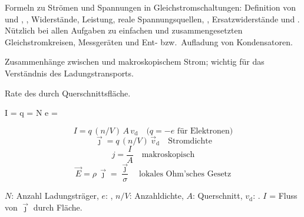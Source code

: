 

\begin{runintext}
Formeln zu Strömen und Spannungen in Gleichstromschaltungen: Definition von  und , , Widerstände, Leistung, reale Spannungsquellen, , Ersatzwiderstände und . Nützlich bei allen Aufgaben zu einfachen und zusammengesetzten Gleichstromkreisen, Messgeräten und Ent- bzw.\ Aufladung von Kondensatoren.
\end{runintext}

\begin{runintext}
Zusammenhänge zwischen  und makroskopischem Strom; wichtig für das Verständnis des Ladungstransports.
\end{runintext}
\begin{defbox}
Rate des  durch Querschnittsfläche.
\end{defbox}
\begin{formulabox}
\begin{longformula}
I =  \quad {} q = N e \quad\Rightarrow\quad {} = 
\end{longformula}
\formulasep
\[ I = q\,(n/V)\,A\,v_{\mathrm{d}} \quad \text{($q=-e$ für Elektronen)} \]
\[ \vec{\jmath} = q\,(n/V)\,\vec{v}_{\mathrm{d}} \quad \text{Stromdichte} \]
\formulasep
\[ j = \frac{I}{A} \quad \text{makroskopisch} \]
\[ \vec{E} = \rho\,\vec{\jmath} = \frac{\vec{\jmath}}{\sigma} \quad \text{lokales Ohm'sches Gesetz} \]
\end{formulabox}
\begin{runintext}
$N$: Anzahl Ladungsträger, $e$: , $n/V$: Anzahldichte, $A$: Querschnitt, $v_{\mathrm{d}}$: . $I$ = Fluss von $\vec{\jmath}$ durch Fläche.
\end{runintext}

